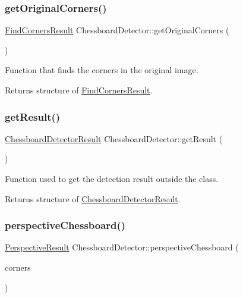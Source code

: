 \subsubsection{\texorpdfstring{get\+Original\+Corners()}{getOriginalCorners()}}
{\footnotesize\ttfamily \hyperlink{struct_find_corners_result}{Find\+Corners\+Result} Chessboard\+Detector\+::get\+Original\+Corners (\begin{DoxyParamCaption}{ }\end{DoxyParamCaption})}



Function that finds the corners in the original image. 

\begin{DoxyReturn}{Returns}
structure of \hyperlink{struct_find_corners_result}{Find\+Corners\+Result}. 
\end{DoxyReturn}
\mbox{\label{class_chessboard_detector_a84f8880402d0829ed6fc13ed45a141c4}} 
\subsubsection{\texorpdfstring{get\+Result()}{getResult()}}
{\footnotesize\ttfamily \hyperlink{struct_chessboard_detector_result}{Chessboard\+Detector\+Result} Chessboard\+Detector\+::get\+Result (\begin{DoxyParamCaption}{ }\end{DoxyParamCaption})}



Function used to get the detection result outside the class. 

\begin{DoxyReturn}{Returns}
structure of \hyperlink{struct_chessboard_detector_result}{Chessboard\+Detector\+Result}. 
\end{DoxyReturn}
\mbox{\label{class_chessboard_detector_a591172112aeddde99db0f3dafda05b89}} 
\subsubsection{\texorpdfstring{perspective\+Chessboard()}{perspectiveChessboard()}}
{\footnotesize\ttfamily \hyperlink{struct_perspective_result}{Perspective\+Result} Chessboard\+Detector\+::perspective\+Chessboard (\begin{DoxyParamCaption}\item[{\hyperlink{struct_find_corners_result}{Find\+Corners\+Result}}]{corners }\end{DoxyParamCaption})}



